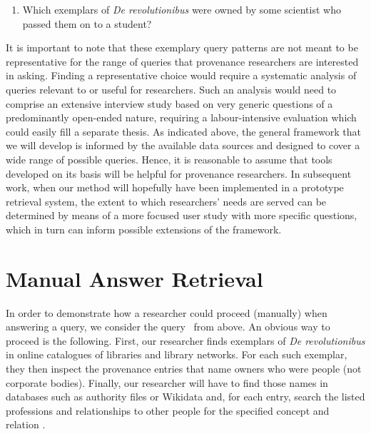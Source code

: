 %
\newcommand{\Qtwoprime}{%
  \begin{enumerate}
    \item[\exaquery{2$'$}]
      Which exemplars of \emph{De revolutionibus} were owned by some scientist who passed them on to a student?
  \end{enumerate}
}%
\Qtwoprime
%
It is important to note that these exemplary query patterns are not meant to be representative
for the range of queries that provenance researchers are interested in asking.
Finding a representative choice would require a systematic analysis
of queries relevant to or useful for researchers.
Such an analysis would need to comprise an extensive interview study
based on very generic questions of a predominantly open-ended nature,
requiring a labour-intensive evaluation which could easily fill a separate thesis.
As indicated above, the general framework that we will develop
is informed by the available data sources
and designed to cover a wide range of possible queries.
Hence,
it is reasonable to assume that tools developed on its basis will be helpful for provenance researchers.
In subsequent work, when our method will hopefully have been implemented in a prototype retrieval system,
the extent to which researchers' needs are served can be determined by means of a more focused user study
with more specific questions, which in turn can inform possible extensions of the framework.

\section{Manual Answer Retrieval}
\label{sec:manual_answering}

In order to demonstrate how a researcher could proceed (manually) when answering a query,
we consider the query~ from above.
An obvious way to proceed is the following.
First, our researcher finds exemplars of \emph{De revolutionibus} 
in online catalogues of libraries and library networks. For each such exemplar, they then inspect the provenance entries
that name owners who were people (not corporate bodies). Finally, our researcher will have to find those names in databases such as
authority files or Wikidata and, for each entry, search the listed professions 
and relationships to other people for the specified concept  and relation .

